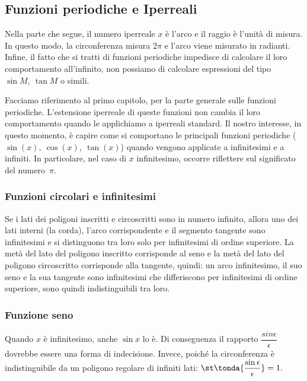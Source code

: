 \subsection{Funzioni periodiche e Iperreali}
\label{subsubsec:insnum_periodiche}
Nella parte che segue, il numero iperreale \(x\) è l'arco e il raggio è 
l'unità di misura. In questo modo, la circonferenza misura \(2\pi\) e l'arco 
viene misurato in radianti.\\
Infine, il fatto che si tratti di funzioni periodiche impedisce di calcolare
il loro comportamento all'infinito, 
non possiamo di calcolare espressioni del tipo \(\sin M,\ \tan M\) o simili.

Facciamo riferimento al primo capitolo, per la parte generale 
sulle funzioni periodiche. L'estensione iperreale di queste funzioni
non cambia il loro comportamento quando le applichiamo a iperreali standard.
Il nostro interesse, in questo momento, è capire come si comportano
le principali funzioni periodiche (\(\sin(x),\ \cos(x),\ \tan(x)\))
quando vengono applicate a infinitesimi e a infiniti. In particolare,
nel caso di \(x\) infinitesimo, occorre riflettere sul significato del
numero~\(\pi\).

\subsubsection{Funzioni circolari e infinitesimi}
Se i lati dei poligoni inscritti e circoscritti sono in numero infinito,
allora uno dei lati interni (la corda), l'arco corrispondente e il segmento 
tangente sono infinitesimi e si distinguono tra loro solo per infinitesimi di 
ordine superiore. 
La metà del lato del poligono inscritto corrisponde al seno e la metà del 
lato del poligono circoscritto corrisponde alla tangente, quindi: 
un arco infinitesimo, il suo seno e la sua tangente sono infinitesimi che 
differiscono per infinitesimi di ordine superiore, sono quindi 
indistinguibili tra loro.

\subsubsection{Funzione seno}
\label{subsubsec:insnum_fseno}
Quando \(x\) è infinitesimo, anche \(\sin x\) lo è. Di conseguenza il rapporto
\(\dfrac{sin\epsilon}{\epsilon}\) dovrebbe essere una forma di indecisione. 
Invece, poiché la circonferenza è indistinguibile da un poligono regolare di 
infiniti lati: \qquad
\(\displaystyle
 \st\tonda{\dfrac{\sin \epsilon}{\epsilon}}=1.
\)


